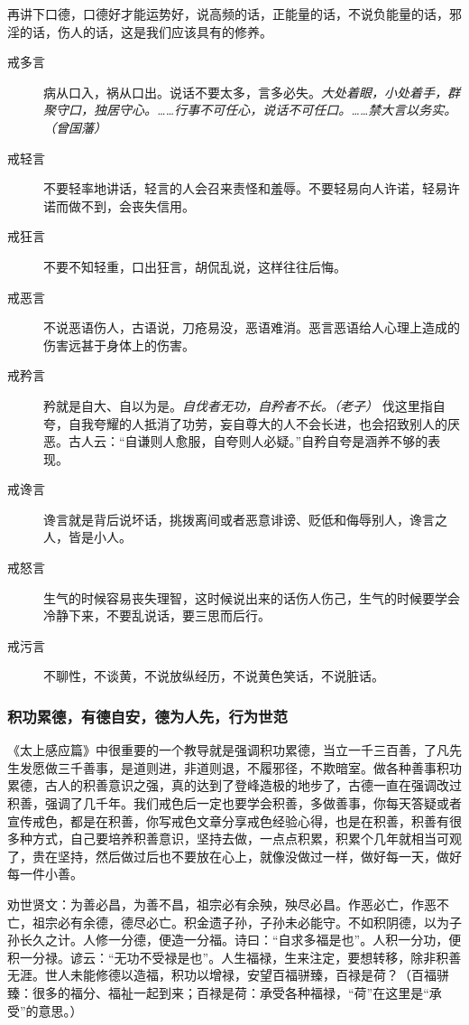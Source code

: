 再讲下口德，口德好才能运势好，说高频的话，正能量的话，不说负能量的话，邪淫的话，伤人的话，这是我们应该具有的修养。

\begin{multicols}{2}
    \begin{description}
        \item[戒多言] 病从口入，祸从口出。说话不要太多，言多必失。\textit{大处着眼，小处着手，群聚守口，独居守心。……行事不可任心，说话不可任口。……禁大言以务实。（曾国藩）}
        \item[戒轻言] 不要轻率地讲话，轻言的人会召来责怪和羞辱。不要轻易向人许诺，轻易许诺而做不到，会丧失信用。
        \item[戒狂言] 不要不知轻重，口出狂言，胡侃乱说，这样往往后悔。
        \item[戒恶言] 不说恶语伤人，古语说，刀疮易没，恶语难消。恶言恶语给人心理上造成的伤害远甚于身体上的伤害。
        \item[戒矜言] 矜就是自大、自以为是。\textit{自伐者无功，自矜者不长。（老子）} 伐这里指自夸，自我夸耀的人抵消了功劳，妄自尊大的人不会长进，也会招致别人的厌恶。古人云：“自谦则人愈服，自夸则人必疑。”自矜自夸是涵养不够的表现。
        \item[戒谗言] 谗言就是背后说坏话，挑拨离间或者恶意诽谤、贬低和侮辱别人，谗言之人，皆是小人。
        \item[戒怒言] 生气的时候容易丧失理智，这时候说出来的话伤人伤己，生气的时候要学会冷静下来，不要乱说话，要三思而后行。
        \item[戒污言] 不聊性，不谈黄，不说放纵经历，不说黄色笑话，不说脏话。
    \end{description}
\end{multicols}

\subsubsection{积功累德，有德自安，德为人先，行为世范}

《太上感应篇》中很重要的一个教导就是强调积功累德，当立一千三百善，了凡先生发愿做三千善事，是道则进，非道则退，不履邪径，不欺暗室。做各种善事积功累德，古人的积善意识之强，真的达到了登峰造极的地步了，古德一直在强调改过积善，强调了几千年。我们戒色后一定也要学会积善，多做善事，你每天答疑或者宣传戒色，都是在积善，你写戒色文章分享戒色经验心得，也是在积善，积善有很多种方式，自己要培养积善意识，坚持去做，一点点积累，积累个几年就相当可观了，贵在坚持，然后做过后也不要放在心上，就像没做过一样，做好每一天，做好每一件小善。

劝世贤文：为善必昌，为善不昌，祖宗必有余殃，殃尽必昌。作恶必亡，作恶不亡，祖宗必有余德，德尽必亡。积金遗子孙，子孙未必能守。不如积阴德，以为子孙长久之计。人修一分德，便造一分福。诗曰：“自求多福是也”。人积一分功，便积一分禄。谚云：“无功不受禄是也”。人生福禄，生来注定，要想转移，除非积善无涯。世人未能修德以造福，积功以增禄，安望百福骈臻，百禄是荷？（百福骈臻：很多的福分、福祉一起到来；百禄是荷：承受各种福禄，“荷”在这里是“承受”的意思。）

